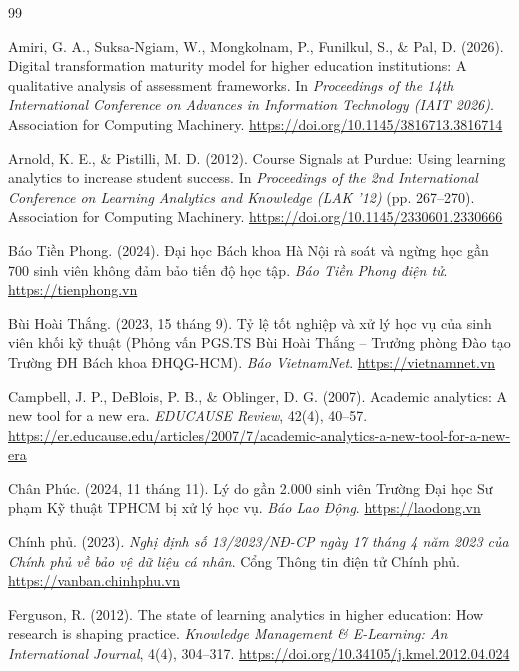 \renewcommand{\refname}{11. Tài liệu tham khảo}

\begin{thebibliography}{99}

Amiri, G. A., Suksa-Ngiam, W., Mongkolnam, P., Funilkul, S., \& Pal, D. (2026). Digital transformation maturity model for higher education institutions: A qualitative analysis of assessment frameworks. In \textit{Proceedings of the 14th International Conference on Advances in Information Technology (IAIT 2026)}. Association for Computing Machinery. \url{https://doi.org/10.1145/3816713.3816714}

Arnold, K. E., \& Pistilli, M. D. (2012). Course Signals at Purdue: Using learning analytics to increase student success. In \textit{Proceedings of the 2nd International Conference on Learning Analytics and Knowledge (LAK '12)} (pp. 267--270). Association for Computing Machinery. \url{https://doi.org/10.1145/2330601.2330666}

Báo Tiền Phong. (2024). Đại học Bách khoa Hà Nội rà soát và ngừng học gần 700 sinh viên không đảm bảo tiến độ học tập. \textit{Báo Tiền Phong điện tử}. \url{https://tienphong.vn}

Bùi Hoài Thắng. (2023, 15 tháng 9). Tỷ lệ tốt nghiệp và xử lý học vụ của sinh viên khối kỹ thuật (Phỏng vấn PGS.TS Bùi Hoài Thắng -- Trưởng phòng Đào tạo Trường ĐH Bách khoa ĐHQG-HCM). \textit{Báo VietnamNet}. \url{https://vietnamnet.vn}

Campbell, J. P., DeBlois, P. B., \& Oblinger, D. G. (2007). Academic analytics: A new tool for a new era. \textit{EDUCAUSE Review}, 42(4), 40--57. \url{https://er.educause.edu/articles/2007/7/academic-analytics-a-new-tool-for-a-new-era}

Chân Phúc. (2024, 11 tháng 11). Lý do gần 2.000 sinh viên Trường Đại học Sư phạm Kỹ thuật TPHCM bị xử lý học vụ. \textit{Báo Lao Động}. \url{https://laodong.vn}

Chính phủ. (2023). \textit{Nghị định số 13/2023/NĐ-CP ngày 17 tháng 4 năm 2023 của Chính phủ về bảo vệ dữ liệu cá nhân}. Cổng Thông tin điện tử Chính phủ. \url{https://vanban.chinhphu.vn}

Ferguson, R. (2012). The state of learning analytics in higher education: How research is shaping practice. \textit{Knowledge Management \& E-Learning: An International Journal}, 4(4), 304--317. \url{https://doi.org/10.34105/j.kmel.2012.04.024}


\end{thebibliography}
